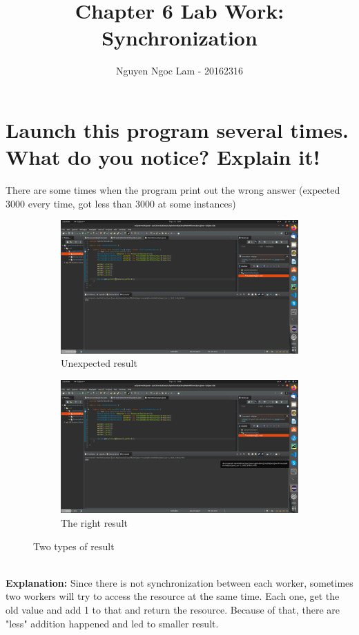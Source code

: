 \documentclass[11pt,a4paper]{article}
\title{Chapter 6 Lab Work: Synchronization}
\date{\displaydate{date}}
\author{Nguyen Ngoc Lam - 20162316}
\begin{document}
\maketitle
\newpage
{}
\tableofcontents
\newpage

\section{Launch this program several times. What do you notice? Explain it!}
There are some times when the program print out the wrong answer (expected 3000 every time, got less than 3000 at some instances)
\begin{figure}[h!]
	\centering
  	\begin{subfigure}[b]{0.4\linewidth}
  		\includegraphics[width=\linewidth]{less-3000.png}
    	\caption{Unexpected result}
  	\end{subfigure}
  	\begin{subfigure}[b]{0.4\linewidth}
    	\includegraphics[width=\linewidth]{exact-3000.png}
    	\caption{The right result}
  	\end{subfigure}
  	\caption{Two types of result}
  	\label{fig:wosync}
\end{figure}
\\\textbf{Explanation:} Since there is not synchronization between each worker, sometimes two workers will try to access the resource at the same time. Each one, get the old value and add 1 to that and return the resource. Because of that, there are "less" addition happened and led to smaller result.
\end{document}
